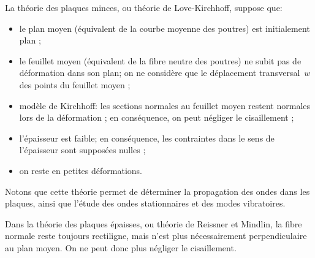 \begin{histoire}
\medskip
La théorie des plaques minces, ou théorie de Love-Kirchhoff, suppose que:
\begin{itemize}
  \item le plan moyen (équivalent de la courbe moyenne des poutres) est initialement plan ;
  \item le feuillet moyen (équivalent de la fibre neutre des poutres) ne subit pas de déformation
	dans son plan; on ne considère que le déplacement transversal~$w$ des points du feuillet moyen ;
  \item modèle de Kirchhoff:
	les sections normales au feuillet moyen restent normales lors de la
	déformation ; en conséquence, on peut négliger le cisaillement ;
  \item l'épaisseur est faible; en conséquence, les contraintes dans le sens de l'épaisseur sont
	supposées nulles ;
  \item on reste en petites déformations.
\end{itemize}
Notons que cette théorie permet de déterminer la propagation des ondes dans les plaques,
ainsi que l'étude des ondes stationnaires et des modes vibratoires.

\medskip
Dans la théorie des plaques épaisses, ou théorie de Reissner
et Mindlin, la fibre normale reste
toujours rectiligne, mais n'est plus nécessairement perpendiculaire au plan moyen.
On ne peut donc plus négliger le cisaillement.
\end{histoire}

